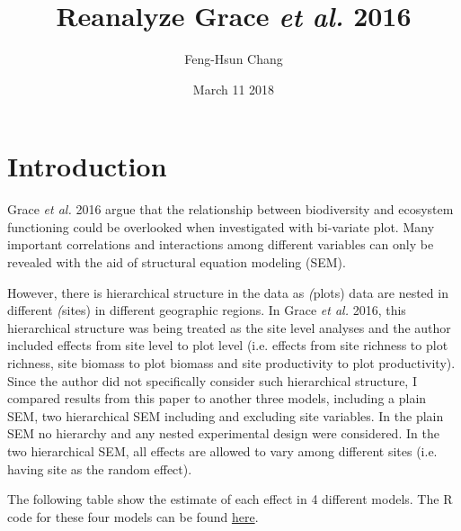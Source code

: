 \documentclass{article}
\title{Reanalyze Grace \textit{et al.} 2016}
\author{Feng-Hsun Chang}
\date{March 11 2018}
\begin{document}
\maketitle

\section{Introduction}

Grace \textit{et al.} 2016 \cite{Grace2016} argue that the relationship between biodiversity and ecosystem functioning could be overlooked when investigated with bi-variate plot. Many important correlations and interactions among different variables can only be revealed with the aid of structural equation modeling (SEM).  

However, there is hierarchical structure in the data as \textit(plots) data are nested in different \textit(sites) in different geographic regions. In Grace \textit{et al.} 2016, this hierarchical structure was being treated as the site level analyses and the author included effects from site level to plot level (i.e. effects from site richness to plot richness, site biomass to plot biomass and site productivity to plot productivity). Since the author did not specifically consider such hierarchical structure, I compared results from this paper to another three models, including a plain SEM, two hierarchical SEM including and excluding site variables. In the plain SEM no hierarchy and any nested experimental design were considered. In the two hierarchical SEM, all effects are allowed to vary among different sites (i.e. having site as the random effect). 

The following table show the estimate of each effect in 4 different models. The R code for these four models can be found \href{https://github.com/OscarFHC/Grace2016/blob/master/Grace2016_ReAnalyses.R}{here}. 
\end{document}

